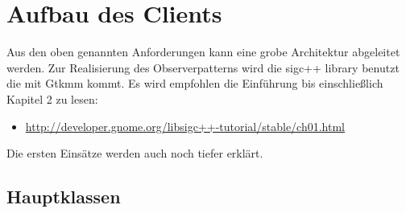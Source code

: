 \section{Aufbau des Clients}

Aus den oben genannten Anforderungen kann eine grobe Architektur abgeleitet werden.
Zur Realisierung des Observerpatterns wird die sigc++ library benutzt die mit Gtkmm kommt.
Es wird empfohlen die Einführung bis einschließlich Kapitel 2 zu lesen:
\begin{itemize}
\item \url{http://developer.gnome.org/libsigc++-tutorial/stable/ch01.html}
\end{itemize}
Die ersten Einsätze werden auch noch tiefer erklärt.


\subsection{Hauptklassen}

